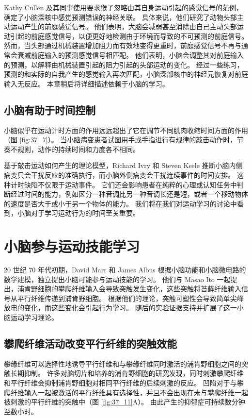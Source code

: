 Kathy Cullen 及其同事使用要求猴子忽略由其自身运动引起的感觉信号的范例，确定了小脑深核中感觉预测错误的神经关联。 具体来说，他们研究了动物头部主动运动产生的前庭感觉信号。 他们表明，大脑会减弱甚至消除由自己主动头部运动引起的前庭感觉信号，以便更好地检测由于环境而导致的不可预测的前庭信号。 然而，当头部通过机械装置增加阻力而有效地变得更重时，前庭感觉信号不再与通常会衰减前庭输入的预测感觉信号相匹配。 他们表明，小脑会调整其对前庭输入的预测，以解释由机械装置引起的阻力引起的头部运动的变化。 经过一些练习，预测的和实际的自我产生的感觉输入再次匹配，小脑深部核中的神经元恢复对前庭输入无反应。 本章稍后将详细描述依赖于小脑的学习。

\subsection{小脑有助于时间控制}

小脑似乎在运动计时方面的作用远远超出了它在调节不同肌肉收缩时间方面的作用（图 \ref{fig:37_7}）。 当小脑病变患者试图用手或手指进行有规律的敲击动作时，节奏不规则，动作的持续时间和力度各不相同。

基于敲击运动如何产生的理论模型，Richard Ivry 和 Steven Keele 推断小脑内侧病变只会干扰反应的准确执行，而小脑外侧病变会干扰连续事件的时间安排。 这种计时缺陷不仅限于运动事件。 它们还会影响患者在纯粹的心理或认知任务中判断经过时间的能力，例如区分一种音调比另一种音调长还是短，或者一个移动物体的速度是否大于或小于另一个物体的能力。 我们将在我们对运动学习的讨论中看到，小脑对于学习运动行为的时间至关重要。


\section{小脑参与运动技能学习}
20 世纪 70 年代初期，David Marr 和 James Albus 根据小脑功能和小脑微电路的数学建模，独立提出小脑可能参与运动技能的学习。 他们与 Masao Ito 一起提出，浦肯野细胞的攀爬纤维输入会导致突触发生变化，这些突触将苔藓纤维输入信号从平行纤维传递到浦肯野细胞。 根据他们的理论，突触可塑性会导致简单尖峰放电的变化，而这些变化会引起行为学习。 随后的实验证据支持并扩展了这一小脑运动学习理论。

\subsection{攀爬纤维活动改变平行纤维的突触效能}
攀缘纤维可以选择性地诱导平行纤维和与攀缘纤维同时激活的浦肯野细胞之间的突触长期抑制。 许多对脑切片和培养的浦肯野细胞的研究发现，同时刺激攀爬纤维和平行纤维会抑制浦肯野细胞对相同平行纤维的后续刺激的反应。 
凹陷对于与攀爬纤维输入一起被激活的平行纤维具有选择性，并且不会出现在未与攀爬纤维一起被刺激的平行纤维的突触中（图 \ref{fig:37_11}A）。 
由此产生的抑郁症可持续数分钟至数小时。

